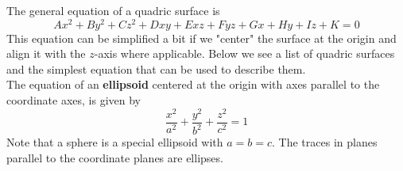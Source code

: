 \documentclass[handout]{ximera}
\begin{document}
\begin{image}
\end{image}

\begin{image}
\end{image}

\begin{image}
\end{image}



The general equation of a quadric surface is 
\[
Ax^2 + By^2 + Cz^2 + Dxy + Exz + Fyz + Gx + Hy + Iz + K = 0
\]
This equation can be simplified a bit if we "center" the surface at the origin and 
align it with the $z$-axis where applicable. 
Below we see a list of quadric surfaces and the simplest equation that can be used to describe them.\\

The equation of an \textbf{ellipsoid} centered at the origin with axes parallel to the coordinate axes, is given by 
\[
\frac{x^2}{a^2} + \frac{y^2}{b^2}+ \frac{z^2}{c^2} = 1
\]
Note that a sphere is a special ellipsoid with $ a=b=c$.
The traces in planes parallel to the coordinate planes are ellipses.
\end{document}
